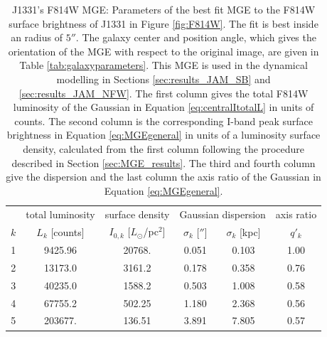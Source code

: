 \begin{table}
\centering
\caption{J1331's F814W MGE: Parameters of the best fit MGE to the F814W surface brightness of J1331 in Figure \ref{fig:F814W}. The fit is best inside an radius of $5''$. The galaxy center and position angle, which gives the orientation of the MGE with respect to the original image, are given in Table \ref{tab:galaxyparameters}. This MGE is used in the dynamical modelling in Sections \ref{sec:results_JAM_SB} and \ref{sec:results_JAM_NFW}.  The first column gives the total F814W luminosity of the Gaussian in Equation \ref{eq:centralItotalL} in units of counts. The second column is the corresponding I-band peak surface brightness in Equation \ref{eq:MGEgeneral} in units of a luminosity surface density, calculated from the first column following the procedure described in Section \ref{sec:MGE_results}. The third and fourth column give the dispersion and the last column the axis ratio of the Gaussian in Equation \ref{eq:MGEgeneral}.}
\begin{tabular}{cccccc}
\hline
 & total luminosity  & surface density & \multicolumn{2}{c}{Gaussian dispersion} & axis ratio\\
$k$  & $L_k$ [counts] & $I_{0,k}$ [$L_\odot$/pc$^2$] & $\sigma_k$ [$''$] & $\sigma_k$ [kpc] & $q'_k$\\\hline
1  &     9425.96 &      20768.  &  0.051   & 0.103  & 1.00\\
2  &    13173.0 &        3161.2 &  0.178   & 0.358  & 0.76\\
3  &    40235.0 &        1588.2 &  0.503   & 1.008  & 0.58\\
4  &    67755.2 &         502.25&  1.180   & 2.368  & 0.56\\
5  &    203677. &         136.51&  3.891   & 7.805  & 0.57\\\hline
\end{tabular}
\label{tab:MGEF814W}
\end{table}

